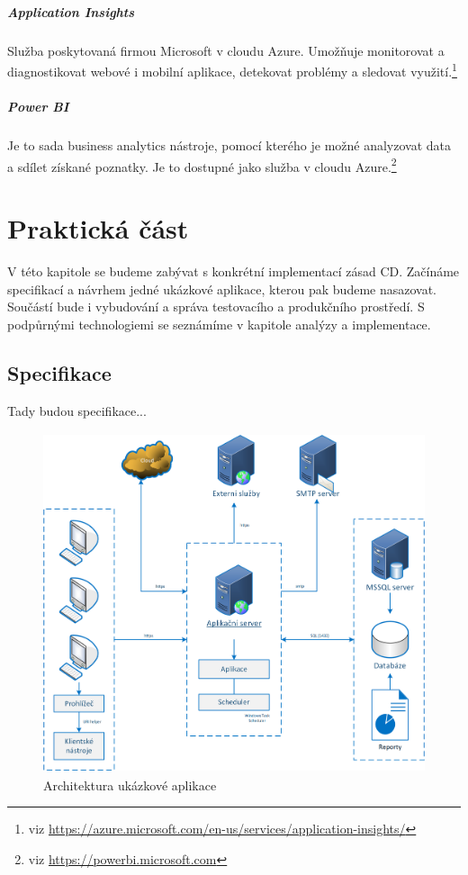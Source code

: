 \paragraph{Application Insights}
Služba poskytovaná firmou Microsoft v cloudu Azure. Umožňuje monitorovat a diagnostikovat webové i mobilní aplikace, detekovat problémy a sledovat využití.\footnote{viz \url{https://azure.microsoft.com/en-us/services/application-insights/}}

\paragraph{Power BI}
Je to sada business analytics nástroje, pomocí kterého je možné analyzovat data a sdílet získané poznatky. Je to dostupné jako služba v cloudu Azure.\footnote{viz \url{https://powerbi.microsoft.com}}

\chapter{Praktická část}
\label{ch:impl}
V této kapitole se budeme zabývat s konkrétní implementací zásad CD. Začínáme specifikací a návrhem jedné ukázkové aplikace, kterou pak budeme nasazovat. Součástí bude i vybudování a správa testovacího a produkčního prostředí. S podpůrnými technologiemi se seznámíme v kapitole analýzy a implementace.

\section{Specifikace}
Tady budou specifikace...

\begin{figure}[]
  \centering
  \includegraphics[height=10cm]{fig/app_architektura.png}
  \caption{Architektura ukázkové aplikace}
  \label{fig:architektura}
\end{figure}

